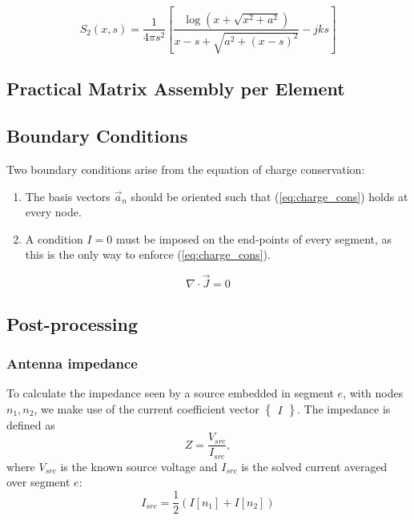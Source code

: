 \begin{equation}
	S_2(x, s) = \frac{1}{4\pi s^2} \left[ \frac{\log\left( x + \sqrt{x^2 + a^2} \right)}{x - s + \sqrt{a^2 + (x - s)^2}} - j k s\right]
\end{equation}

\subsection{Practical Matrix Assembly per Element}

\subsection{Boundary Conditions}
\label{sec:mom_bc}
Two boundary conditions arise from the equation of charge conservation:
\begin{enumerate}
	\item The basis vectors $\vec{a}_n$ should be oriented such that (\ref{eq:charge_cons}) holds at every node.
	\item A condition $I = 0$ must be imposed on the end-points of every segment, as this is the only way to enforce (\ref{eq:charge_cons}).
\end{enumerate}
\begin{equation}
	\nabla \cdot \vec{J} = 0
	\label{eq:charge_cons}	
\end{equation}

\subsection{Post-processing}

\subsubsection{Antenna impedance}
To calculate the impedance seen by a source embedded in segment $e$, with nodes $n_1, n_2$, we make use of the current coefficient vector $\begin{Bmatrix}
	I
\end{Bmatrix}$. The impedance is defined as
\begin{equation}
	Z = \frac{V_{src}}{I_{src}},
\end{equation}
where $V_{src}$ is the known source voltage and $I_{src}$ is the solved current averaged over segment $e$:
\begin{equation*}
	I_{src} = \frac{1}{2}\left( I[n_1] + I[n_2] \right)
\end{equation*}

